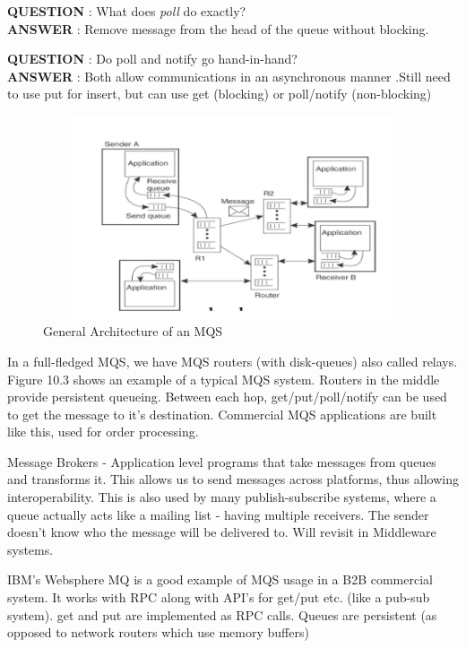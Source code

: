 \documentclass[twoside]{article}
\begin{document}
\textbf{QUESTION} : What does \textit{poll} do exactly?\\ 
\textbf{ANSWER} : Remove message from the head of the queue without blocking.

\textbf{QUESTION} : Do poll and notify go hand-in-hand?\\ 
\textbf{ANSWER} : Both allow communications in an asynchronous manner .Still need to use put for insert, but can use get (blocking) or poll/notify (non-blocking) 

\begin{figure}
\includegraphics[width=12cm, height=6cm]{MQS.png}
\centering
\caption{General Architecture of an MQS}
\end{figure}

In a full-fledged MQS, we have MQS routers (with disk-queues) also called relays. Figure 10.3 shows an example of a typical MQS system. 
Routers in the middle provide persistent queueing. Between each hop, get/put/poll/notify can be used to get the message to it's destination. 
Commercial MQS applications are built like this, used for order processing.

Message Brokers  - Application level programs that take messages from queues and transforms it. This allows us to send messages across platforms, thus allowing interoperability. This is also used by many publish-subscribe systems, where a queue actually acts like a mailing list - having multiple receivers. The sender doesn't know who the message will be delivered to. Will revisit in Middleware systems.

IBM's Websphere MQ is a good example of MQS usage in a B2B commercial system. It works with RPC along with API's for get/put etc. (like a pub-sub system). get and put are implemented as RPC calls. Queues are persistent (as opposed to network routers which use memory buffers)
\end{document}
